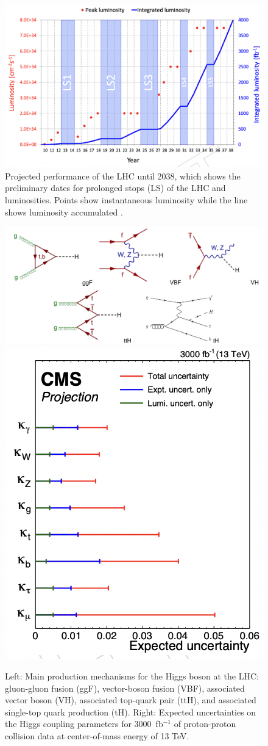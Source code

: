 \documentclass[final,12p]{article}
\newcommand{\lumi}[1]{{#1~fb$^{-1}$}}
\begin{document}
\begin{figure}[H]
  \centering
  \includegraphics[width=0.8\columnwidth]{./HLLHCLumi.png}
  \caption{Projected performance of the LHC until 2038, which shows the preliminary dates for prolonged stops (LS) of the LHC and luminosities. Points show instantaneous luminosity while the line shows luminosity accumulated \cite{collaborations2019report}.}
  \label{figure6}
\end{figure}


 \begin{figure}[H]
   \centering
   \includegraphics[width=0.7\columnwidth]{./pg.png}
   \includegraphics[width=0.29\columnwidth]{./higgs_couplings.png}
   \caption{
     Left: Main production mechanisms for the Higgs boson at the LHC: gluon-gluon fusion (ggF), vector-boson fusion (VBF), associated vector boson (VH), associated top-quark pair (ttH), and  associated single-top quark production (tH).
     Right: Expected uncertainties on the Higgs coupling parameters for  \lumi{3000} of proton-proton collision data at center-of-mass energy of 13 TeV.
   }
   \label{figureKappasUncs}
 \end{figure}
\end{document}
